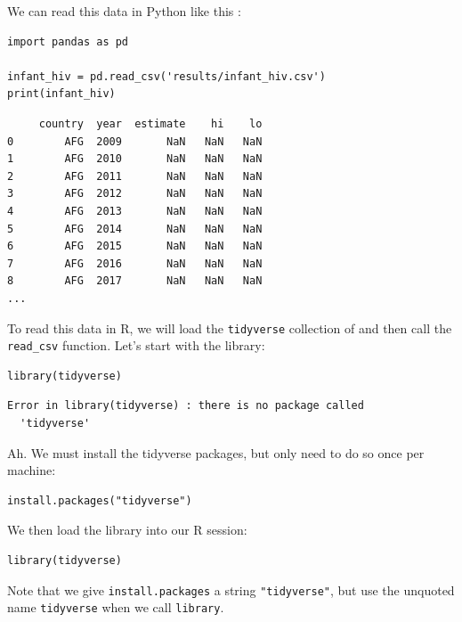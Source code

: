 We can read this data in Python like this \cite{Chen2017}:

\begin{lstlisting}
import pandas as pd

infant_hiv = pd.read_csv('results/infant_hiv.csv')
print(infant_hiv)
\end{lstlisting}

\begin{lstlisting}
     country  year  estimate    hi    lo
0        AFG  2009       NaN   NaN   NaN
1        AFG  2010       NaN   NaN   NaN
2        AFG  2011       NaN   NaN   NaN
3        AFG  2012       NaN   NaN   NaN
4        AFG  2013       NaN   NaN   NaN
5        AFG  2014       NaN   NaN   NaN
6        AFG  2015       NaN   NaN   NaN
7        AFG  2016       NaN   NaN   NaN
8        AFG  2017       NaN   NaN   NaN
...
\end{lstlisting}

To read this data in R,
we will load the \texttt{tidyverse} collection of 
and then call the \texttt{read\_csv} function.
Let's start with the library:

\begin{lstlisting}
library(tidyverse)
\end{lstlisting}

\begin{lstlisting}
Error in library(tidyverse) : there is no package called
  'tidyverse'
\end{lstlisting}

\noindent
Ah.
We must install the tidyverse packages,
but only need to do so once per machine:

\begin{lstlisting}
install.packages("tidyverse")
\end{lstlisting}

\noindent
We then load the library into our R session:

\begin{lstlisting}
library(tidyverse)
\end{lstlisting}

\noindent
Note that we give \texttt{install.packages} a string \texttt{"tidyverse"},
but use the unquoted name \texttt{tidyverse} when we call \texttt{library}.

